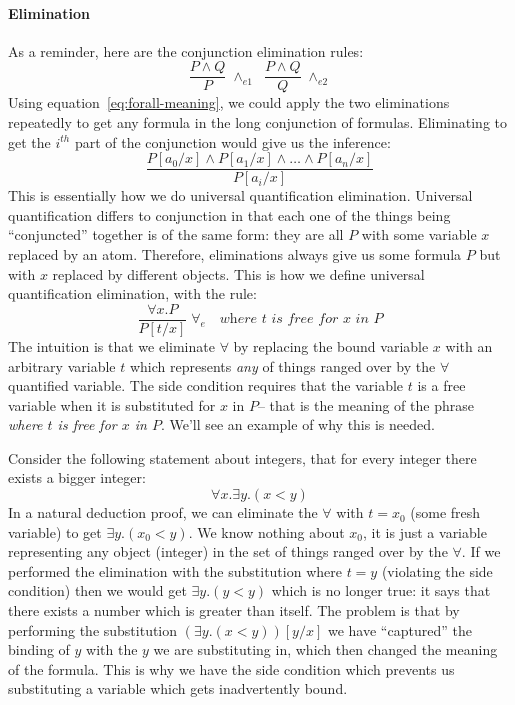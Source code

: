 \documentclass{article}
\theoremstyle{definition}
\begin{document}
\paragraph{Elimination} As a reminder, here
are the conjunction elimination rules:
%
\begin{equation*}
\dfrac{P \wedge Q}
        {P} \; {\wedge_{e1}}
\;\;
\dfrac{P \wedge Q}
  {Q} \; {\wedge_{e2}}
\end{equation*}
%
Using equation~\eqref{eq:forall-meaning}, we could apply the two
eliminations repeatedly to get any formula in the long conjunction of
formulas. Eliminating to get the $i^{th}$ part of the conjunction
would give us the inference:
%
\begin{equation*}
  \dfrac{P[a_0/x] \wedge P[a_1/x] \wedge \ldots \wedge P[a_{n}/x]}
  {P[a_i/x]}
\end{equation*}
%
This is essentially how we do universal quantification elimination.
Universal quantification differs to conjunction in that each one of the things
being ``conjuncted'' together is of the same form: they are all $P$
with some variable $x$ replaced by an atom. Therefore, eliminations
always give us some formula $P$ but with $x$ replaced by different objects. This is how
we define universal quantification elimination, with the rule:
%
\begin{equation*}
  \dfrac{\forall x . P}
  {P [t/x]} \; {\forall_e} \quad \textit{where $t$ is free for $x$ in $P$}
\end{equation*}
%
The intuition is that we eliminate $\forall$ by replacing the bound
variable $x$ with an arbitrary variable $t$ which represents
\emph{any} of things ranged over by the $\forall$ quantified variable.
The side condition requires that the variable $t$ is a free variable
 when it is substituted for $x$ in $P$-- that is the meaning of the
 phrase \emph{where $t$ is free for $x$ in $P$}. We'll see an example of
why this is needed.

Consider the following statement about integers, that for
every integer there exists a bigger integer:
%
\begin{equation*}
  \forall x . \exists y . (x < y)
\end{equation*}
In a natural deduction proof, we can eliminate the $\forall$ with
$t = x_0$ (some fresh variable) to get $\exists y . (x_0 < y)$. We
know nothing about $x_0$, it is just a variable representing any
object (integer) in the set of things ranged over by the $\forall$.
If we performed the elimination with the substitution where
$t = y$ (violating the side condition) then we would get
$\exists y . (y < y)$ which is no longer true: it says that there
exists a number which is greater than itself. The problem is that by
performing the substitution $(\exists y. (x < y))[y/x]$ we have
``captured'' the binding of $y$ with the $y$ we are substituting in,
which then changed the meaning of the formula. This is why we have the
side condition which prevents us substituting a variable which
gets inadvertently bound.
\end{document}
